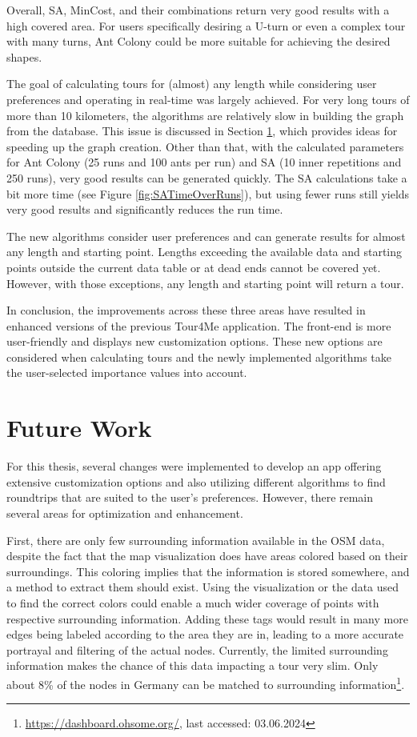 Overall, SA, MinCost, and their combinations return very good results with a high covered area.
For users specifically desiring a U-turn or even a complex tour with many turns, Ant Colony could be more suitable for achieving the desired shapes.

The goal of calculating tours for (almost) any length while considering user preferences and operating in real-time was largely achieved.
For very long tours of more than 10 kilometers, the algorithms are relatively slow in building the graph from the database.
This issue is discussed in Section \ref{sec:futureWork}, which provides ideas for speeding up the graph creation.
Other than that, with the calculated parameters for Ant Colony (25 runs and 100 ants per run) and SA (10 inner repetitions and 250 runs), very good results can be generated quickly.
The SA calculations take a bit more time (see Figure \ref{fig:SATimeOverRuns}), but using fewer runs still yields very good results and significantly reduces the run time.



The new algorithms consider user preferences and can generate results for almost any length and starting point.
Lengths exceeding the available data and starting points outside the current data table or at dead ends cannot be covered yet.
However, with those exceptions, any length and starting point will return a tour.

In conclusion, the improvements across these three areas have resulted in enhanced versions of the previous Tour4Me application.
The front-end is more user-friendly and displays new customization options.
These new options are considered when calculating tours and the newly implemented algorithms take the user-selected importance values into account.



\section{Future Work}
\label{sec:futureWork}

For this thesis, several changes were implemented to develop an app offering extensive customization options and also utilizing different algorithms to find roundtrips that are suited to the user's preferences.
However, there remain several areas for optimization and enhancement.

First, there are only few surrounding information available in the OSM data, despite the fact that the map visualization does have areas colored based on their surroundings.
This coloring implies that the information is stored somewhere, and a method to extract them should exist.
Using the visualization or the data used to find the correct colors could enable a much wider coverage of points with respective surrounding information. 
Adding these tags would result in many more edges being labeled according to the area they are in, leading to a more accurate portrayal and filtering of the actual nodes.
Currently, the limited surrounding information makes the chance of this data impacting a tour very slim.
Only about 8\% of the nodes in Germany can be matched to surrounding information\footnote{\url{https://dashboard.ohsome.org/}, last accessed: 03.06.2024}.

